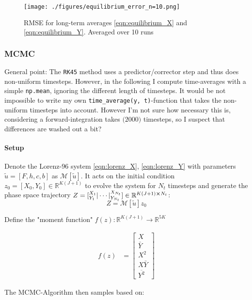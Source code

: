\documentclass[11pt]{article}
\newcommand{\R}{{\mathbb{R}}}
\begin{document}
\begin{figure}[htbp]
\centering
\texttt{[image: ./figures/equilibrium\_error\_n=10.png]}
\caption{\label{fig:lorenz_rmse}
RMSE for long-term averages \ref{eqn:equilibrium_X} and \ref{eqn:equilibrium_Y}. Averaged over 10 runs}
\end{figure}

\subsubsection{MCMC}
\label{sec:org7a26bee}
General point: The \texttt{RK45} method uses a predictor/corrector step and thus does non-uniform timesteps.
However, in the following I compute time-averages with a simple \texttt{np.mean}, ignoring the different
length of timesteps. It would be not impossible to write my own \texttt{time\_average(y, t)}-function that
takes the non-uniform timesteps into account. However I'm not sure how necessary this is, considering
a forward-integration takes \(\mathcal(2000)\) timesteps, so I suspect that differences are washed out
a bit?

\paragraph{Setup}
\label{sec:org5647629}
Denote the Lorenz-96 system \ref{eqn:lorenz_X}, \ref{eqn:lorenz_Y} with parameters \(\tilde{u} = [F, h, c, b]\) as
\(\mathcal{M}[\tilde{u}]\). It acts on the initial condition \(z_0 = [X_0, Y_0] \in \R^{K(J+1)}\) to evolve
the system for \(N_t\) timesteps and generate the phase space trajectory
\(Z = \left[ \smash{{}^{X_1}_{Y_1}} | \cdots | \smash{{}^{X_{N_t}}_{Y_{N_t}}}  \right] \in
   \R^{K(J+1) \cross N_t}\):
$$Z = \mathcal{M}[\tilde{u}] z_0$$

Define the "moment function" \(f(z): \R^{K(J+1)} \to \R^{5K}\)

\begin{align}
  f(z) &=
  \begin{bmatrix}
    X \\
    \bar{Y} \\
    X^2 \\
    X \bar{Y} \\
    \overline{Y^2}
  \end{bmatrix}
\end{align}

The MCMC-Algorithm then samples based on:
\end{document}
